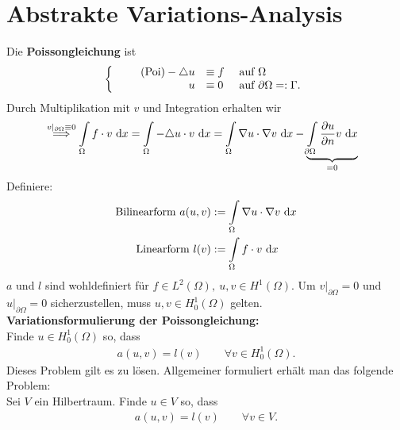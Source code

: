 \section{Abstrakte Variations-Analysis}
Die \textbf{Poissongleichung} ist
\begin{align}
	\left\{
	\begin{array}{r l l}\label{PoissonEquation}\tag{Poi}
		-\triangle u &\equiv f &\text{ auf }\Omega \\
		u &\equiv 0 &\text{ auf }\partial\Omega=:\Gamma.
	\end{array}\right.
\end{align}
Durch Multiplikation mit $v$ und Integration erhalten wir
\begin{align*}
&\stackrel{ v|_{\partial\Omega}\equiv0}{\implies}
\int\limits_\Omega f\cdot v\text{ d} x
=\int\limits_\Omega-\triangle u\cdot v\text{ d} x
=\int\limits_\Omega\nabla u\cdot\nabla v\text{ d} x-\underbrace{\int\limits_{\partial\Omega}\frac{\partial u}{\partial n}v\text{ d} x}_{=0}
\end{align*}
Definiere:
\begin{align*}
\text{Bilinearform } a(u,v)&:=\int\limits_\Omega\nabla u\cdot\nabla v\text{ d} x\\
\text{Linearform } l(v)&:=\int\limits_\Omega f\cdot v\text{ d} x
\end{align*}
$a$ und $l$ sind wohldefiniert für $f\in L^2(\Omega),~u,v\in H^1(\Omega)$. Um $v|_{\partial\Omega}=0$ und $u|_{\partial\Omega}=0$ sicherzustellen, muss $u,v\in H^1_0(\Omega)$ gelten.\\

\textbf{Variationsformulierung der Poissongleichung:}\\
Finde $u\in H_0^1(\Omega)$ so, dass
\begin{align*}
a(u,v)=l(v)\qquad\forall v\in H^1_0(\Omega).
\end{align*}
Dieses Problem gilt es zu lösen. Allgemeiner formuliert erhält man das folgende Problem:\\
Sei $V$ ein Hilbertraum. Finde $u\in V$ so, dass
\begin{align*}
a(u,v)=l(v)\qquad\forall v\in V.
\end{align*}

